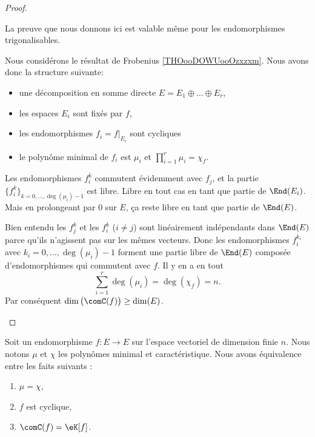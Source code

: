 \begin{proof}
\begin{subproof}
            La preuve que nous donnons ici est valable même pour les endomorphismes trigonalisables.

            Nous considérons le résultat de Frobenius \ref{THOooDOWUooOzxzxm}. Nous avons donc la structure suivante:
            \begin{itemize}
                \item 
            une décomposition en somme directe \( E=E_1\oplus\ldots\oplus E_r\),
        \item
            les espaces \( E_i\) sont fixés par \( f\),
        \item
            les endomorphismes \( f_i=f|_{E_i}\) sont cycliques
        \item
            le polynôme minimal de \( f_i\) est \( \mu_i\) et \( \prod_{i=1}^r\mu_i=\chi_f\).
            \end{itemize}
            Les endomorphismes \( f_i^k\) commutent évidemment avec \( f_j\), et la partie \( \{ f_i^k \}_{k=0,\ldots, \deg(\mu_i)-1}\) est libre. Libre en tout cas en tant que partie de \( \End(E_i)\). Mais en prolongeant par \( 0\) sur \( E\), ça reste libre en tant que partie de \( \End(E)\).

            Bien entendu les \( f_j^k\) et les \( f_i^k\) (\( i\neq j\)) sont linéairement indépendants dans \( \End(E)\) parce qu'ils n'agissent pas sur les mêmes vecteurs. Donc les endomorphismes \( f_i^{k_i}\) avec \( k_i=0,\ldots, \deg(\mu_i)-1\) forment une partie libre de \( \End(E)\) composée d'endomorphismes qui commutent avec \( f\). Il y en a en tout
            \begin{equation}
                \sum_{i=1}^r\deg(\mu_i)=\deg(\chi_f)=n.
            \end{equation}
            Par conséquent \( \dim\big( \comC(f) \big)\geq \dim(E)\).
    \end{subproof}
\end{proof}

\begin{theorem}      \label{THOooGLMSooYewNxW}
    Soit un endomorphisme \( f\colon E\to E\) sur l'espace vectoriel de dimension finie \( n\). Nous notons \( \mu\) et \( \chi\) les polynômes minimal et caractéristique. Nous avons équivalence entre les faits suivants :
    \begin{enumerate}
        \item   \label{ITEMooLRXIooLWaYqJii}
            \( \mu=\chi\),
        \item   \label{ITEMooLRXIooLWaYqJi}
            \( f\) est cyclique,
        \item   \label{ITEMooLRXIooLWaYqJiii}
            \( \comC(f)=\eK[f]\).
    \end{enumerate}
\end{theorem}

